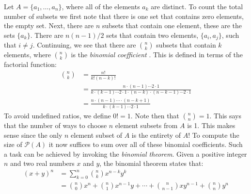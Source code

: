         \begin{example}
            Let $A=\{a_{1},\dots,a_{n}\}$, where all of the elements $a_{k}$ are
            distinct. To count the total number of subsets we first note that
            there is one set that contains zero elements, the empty set. Next,
            there are $n$ subsets that contain one element, these are the sets
            $\{a_{k}\}$. There are $n(n-1)/2$ sets that contain two elements,
            $\{a_{i},a_{j}\}$, such that $i\ne{j}$. Continuing, we see that
            there are $\binom{n}{k}$ subsets that contain $k$ elements, where
            $\binom{n}{k}$ is the \textit{binomial coefficient}%
            . This is defined in terms of the
            factorial function:
            \begin{subequations}
                \begin{align}
                    \binom{n}{k}
                    &=\frac{n!}{k!(n-k)!}\\
                    &=\frac{n\cdot(n-1)\cdots{2}\cdot{1}}
                        {k\cdot(k-1)\cdots{2}\cdot{1}\cdot(n-k)
                        \cdot(n-k-1)\cdots{2}\cdot{1}}\\
                    &=\frac{n\cdot(n-1)\cdots\cdot(n-k+1)}
                        {k\cdot(k-1)\cdots{2}\cdot{1}}
                \end{align}
            \end{subequations}
            To avoid undefined ratios, we define $0!=1$. Note then that
            $\binom{n}{n}=1$. This says that the number of ways to choose $n$
            element subsets from $A$ is 1. This makes sense since the only $n$
            element subset of $A$ is the entirety of $A$! To compute the size of
            $\mathcal{P}(A)$ it now suffices to sum over all of these binomial
            coefficients. Such a task can be achieved by invoking the
            \textit{binomial theorem}. Given
            a positive integer $n$ and two real numbers $x$ and $y$, the
            binomial theorem states that:
            \begin{subequations}
                \begin{align}
                    (x+y)^{n}
                    &=\sum_{k=0}^{n}\binom{n}{k}x^{n-k}y^{k}\\
                    &=\binom{n}{0}x^{n}+\binom{n}{1}x^{n-1}y+\cdots+
                        \binom{n}{n-1}xy^{n-1}+\binom{n}{n}y^{n}
                \end{align}

\end{subequations}
\end{example}
